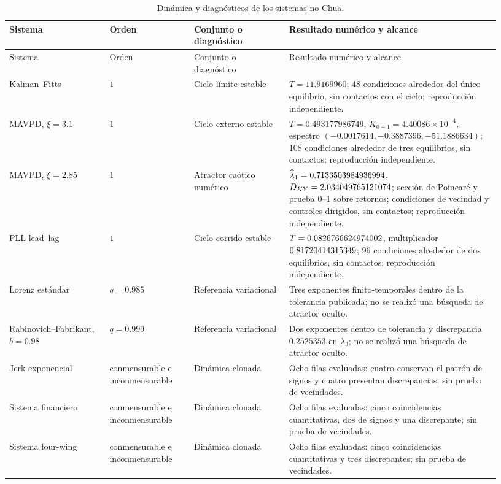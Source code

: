 \begingroup
\small
\setlength{\tabcolsep}{3pt}
\begin{longtable}{@{}L{0.19\linewidth}L{0.16\linewidth}L{0.18\linewidth}L{0.40\linewidth}@{}}
\caption{Dinámica y diagnósticos de los sistemas no Chua.}
\label{tab:nonchua-unified-evidence}\\
\toprule
Sistema & Orden & Conjunto o diagnóstico & Resultado numérico y alcance\\
\midrule
\endfirsthead
\toprule
Sistema & Orden & Conjunto o diagnóstico & Resultado numérico y alcance\\
\midrule
\endhead
Kalman--Fitts & \(1\) & Ciclo límite estable &
\(T=11.9169960\); 48 condiciones alrededor del único equilibrio, sin contactos
con el ciclo; reproducción independiente.\\
MAVPD, \(\xi=3.1\) & \(1\) & Ciclo externo estable &
\(T=0.493177986749\), \(K_{0-1}=4.40086\times10^{-4}\), espectro
\((-0.0017614,-0.3887396,-51.1886634)\); 108 condiciones alrededor de tres
equilibrios, sin contactos; reproducción independiente.\\
MAVPD, \(\xi=2.85\) & \(1\) & Atractor caótico numérico &
\(\widehat\lambda_1=0.7133503984936994\), \(D_{KY}=2.034049765121074\); sección de
Poincaré y prueba 0--1 sobre retornos; \MAVPDChaosTotalProbes{} condiciones de
vecindad y controles dirigidos, sin contactos; reproducción independiente.\\
PLL lead--lag & \(1\) & Ciclo corrido estable &
\(T=0.0826766624974002\), multiplicador
\(0.81720414315349\); 96 condiciones alrededor de dos equilibrios,
sin contactos; reproducción independiente.\\
Lorenz estándar & \(q=0.985\) & Referencia variacional &
Tres exponentes finito-temporales dentro de la tolerancia publicada; no se
realizó una búsqueda de atractor oculto.\\
Rabinovich--Fabrikant, \(b=0.98\) & \(q=0.999\) & Referencia variacional &
Dos exponentes dentro de tolerancia y discrepancia \(0.2525353\) en
\(\lambda_3\); no se realizó una búsqueda de atractor oculto.\\
Jerk exponencial & conmensurable e inconmensurable & Dinámica clonada &
Ocho filas evaluadas: cuatro conservan el patrón de signos y cuatro presentan
discrepancias; sin prueba de vecindades.\\
Sistema financiero & conmensurable e inconmensurable & Dinámica clonada &
Ocho filas evaluadas: cinco coincidencias cuantitativas, dos de signos y una
discrepante; sin prueba de vecindades.\\
Sistema four-wing & conmensurable e inconmensurable & Dinámica clonada &
Ocho filas evaluadas: cinco coincidencias cuantitativas y tres discrepantes;
sin prueba de vecindades.\\
\bottomrule
\end{longtable}
\endgroup

